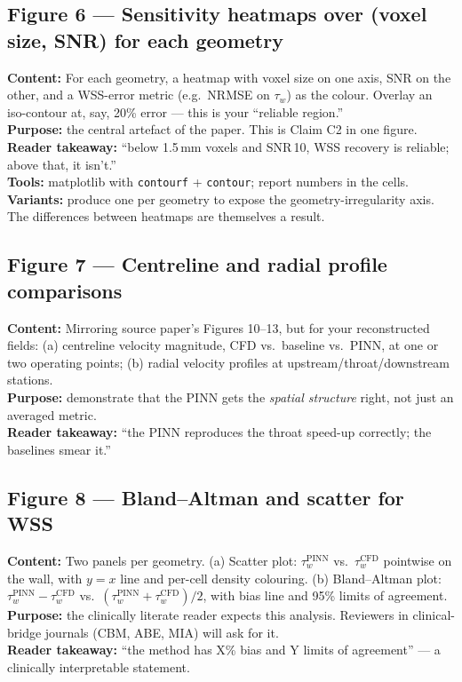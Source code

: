 \documentclass[11pt]{article}
\begin{document}
\subsection*{Figure 6 --- Sensitivity heatmaps over (voxel size, SNR) for each geometry}
\textbf{Content:} For each geometry, a heatmap with voxel size on one axis, SNR on the other, and a WSS-error metric (e.g.\ NRMSE on $\tau_w$) as the colour. Overlay an iso-contour at, say, 20\% error --- this is your ``reliable region.''\\
\textbf{Purpose:} the central artefact of the paper. This is Claim C2 in one figure.\\
\textbf{Reader takeaway:} ``below 1.5\,mm voxels and SNR\,10, WSS recovery is reliable; above that, it isn't.''\\
\textbf{Tools:} matplotlib with \texttt{contourf} + \texttt{contour}; report numbers in the cells.\\
\textbf{Variants:} produce one per geometry to expose the geometry-irregularity axis. The differences between heatmaps are themselves a result.

\subsection*{Figure 7 --- Centreline and radial profile comparisons}
\textbf{Content:} Mirroring source paper's Figures 10--13, but for your reconstructed fields: (a) centreline velocity magnitude, CFD vs.\ baseline vs.\ PINN, at one or two operating points; (b) radial velocity profiles at upstream/throat/downstream stations.\\
\textbf{Purpose:} demonstrate that the PINN gets the \emph{spatial structure} right, not just an averaged metric.\\
\textbf{Reader takeaway:} ``the PINN reproduces the throat speed-up correctly; the baselines smear it.''

\subsection*{Figure 8 --- Bland--Altman and scatter for WSS}
\textbf{Content:} Two panels per geometry. (a) Scatter plot: $\tau_w^{\text{PINN}}$ vs.\ $\tau_w^{\text{CFD}}$ pointwise on the wall, with $y=x$ line and per-cell density colouring. (b) Bland--Altman plot: $\tau_w^{\text{PINN}} - \tau_w^{\text{CFD}}$ vs.\ $(\tau_w^{\text{PINN}} + \tau_w^{\text{CFD}})/2$, with bias line and 95\% limits of agreement.\\
\textbf{Purpose:} the clinically literate reader expects this analysis. Reviewers in clinical-bridge journals (CBM, ABE, MIA) will ask for it.\\
\textbf{Reader takeaway:} ``the method has X\% bias and Y limits of agreement'' --- a clinically interpretable statement.
\end{document}
